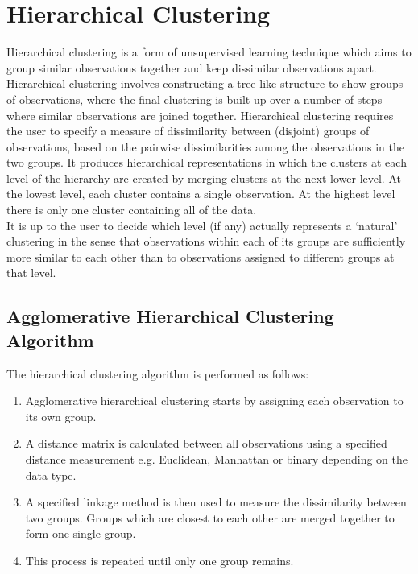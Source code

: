 \documentclass[]{article}
\begin{document}
\section{Hierarchical Clustering}
Hierarchical clustering is a form of unsupervised learning technique which aims to group similar observations together and keep dissimilar observations apart. Hierarchical clustering involves constructing a tree-like structure to show groups of observations, where the final clustering is built up over a number of steps where similar observations are joined together. Hierarchical clustering requires the user to specify a measure of dissimilarity between (disjoint) groups of observations, based on the pairwise dissimilarities among the observations in the two groups. It produces hierarchical representations in which the clusters at each level of the hierarchy are created by merging clusters at the next lower level. At the lowest level, each cluster contains a single observation. At the highest level there is only one cluster containing all of the data.\\

\noindent It is up to the user to decide which level (if any) actually represents a `natural' clustering in the sense that observations within each of its groups are sufficiently more similar to each other than to observations assigned to different groups at that level.

\subsection{Agglomerative Hierarchical Clustering Algorithm}
The hierarchical clustering algorithm is performed as follows:
\begin{enumerate}
	\item Agglomerative hierarchical clustering starts by assigning each observation to its own group.
	\item A distance matrix is calculated between all observations using a specified distance measurement e.g. Euclidean, Manhattan or binary depending on the data type.
	\item A specified linkage method is then used to measure the dissimilarity between two groups. Groups which are closest to each other are merged together to form one single group.
	\item This process is repeated until only one group remains.
\end{enumerate} 
\end{document}
